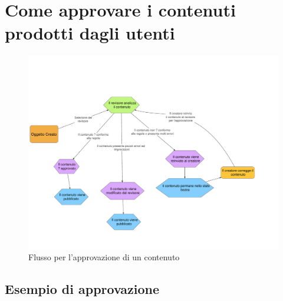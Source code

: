 \chapter[Revisione]{Come approvare i contenuti prodotti dagli utenti}

\begin{figure}[H]
 \centering
 \includegraphics[width=\textwidth]{./immagini/chapter_approval/revisione.pdf}
 \caption{Flusso per l'approvazione di un contenuto}
 \label{fig:approve_workflow1}
\end{figure}

\section{Esempio di approvazione}

